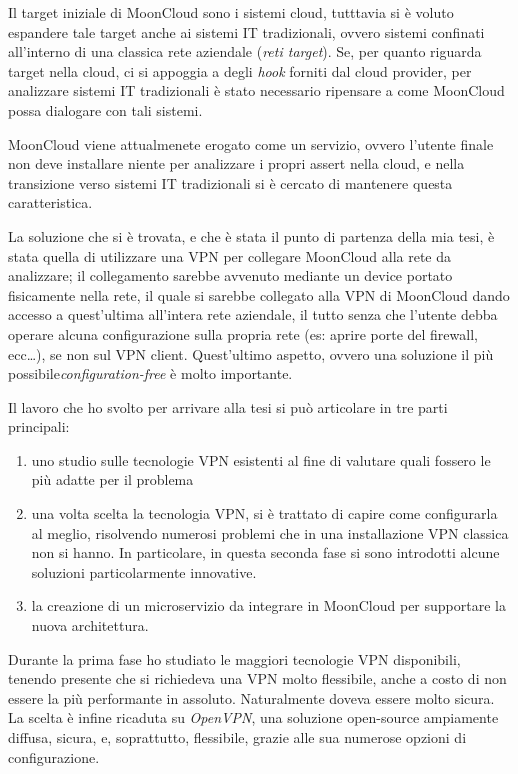 \documentclass[10pt,a4paper]{article}
\begin{document}
        Il target iniziale di MoonCloud sono i sistemi cloud, tutttavia si è voluto espandere
        tale target anche ai sistemi IT tradizionali, ovvero sistemi
        confinati all'interno di una classica rete aziendale (\textit{reti target}).
        Se, per quanto riguarda target nella
        cloud, ci si appoggia a degli \textit{hook} forniti dal cloud provider, per analizzare
        sistemi IT tradizionali è stato necessario ripensare a come MoonCloud possa dialogare
        con tali sistemi.

        MoonCloud viene attualmenete erogato come un servizio, ovvero l'utente finale
        non deve installare niente per analizzare i propri assert nella cloud, e nella transizione
        verso sistemi IT tradizionali si è cercato di mantenere questa caratteristica.


        La soluzione che si è trovata, e che è stata il punto di partenza della mia tesi,
        è stata quella di utilizzare una VPN per collegare MoonCloud alla rete
        da analizzare; il collegamento sarebbe avvenuto mediante un device portato
        fisicamente nella rete, il quale si sarebbe collegato alla VPN di MoonCloud dando
        accesso a quest'ultima all'intera rete aziendale, il tutto senza che
        l'utente debba operare alcuna configurazione sulla propria rete (es: aprire porte
        del firewall, ecc\ldots), se non sul VPN client. Quest'ultimo aspetto, ovvero
        una soluzione il più possibile\textit{configuration-free} è molto importante.

        Il lavoro che ho svolto per arrivare alla tesi si può articolare in tre parti principali:
        \begin{enumerate}
            \item uno studio sulle tecnologie VPN esistenti al fine di valutare quali
            fossero le più adatte per il problema
            \item una volta scelta la tecnologia VPN, si è trattato di capire come
            configurarla al meglio, risolvendo numerosi problemi che in una
            installazione VPN classica non si hanno. In particolare, in questa seconda
            fase si sono introdotti alcune soluzioni particolarmente innovative.
            \item la creazione di un microservizio da integrare in MoonCloud per
            supportare la nuova architettura.
        \end{enumerate}

        
        Durante la prima fase ho studiato le maggiori tecnologie VPN disponibili,
        tenendo presente che si richiedeva una VPN molto flessibile, anche a costo
        di non essere la più performante in assoluto. Naturalmente doveva essere
        molto sicura. La scelta è infine ricaduta su \textit{OpenVPN}, una soluzione open-source
        ampiamente diffusa, sicura, e, soprattutto, flessibile, grazie alle sua numerose
        opzioni di configurazione.
\end{document}

